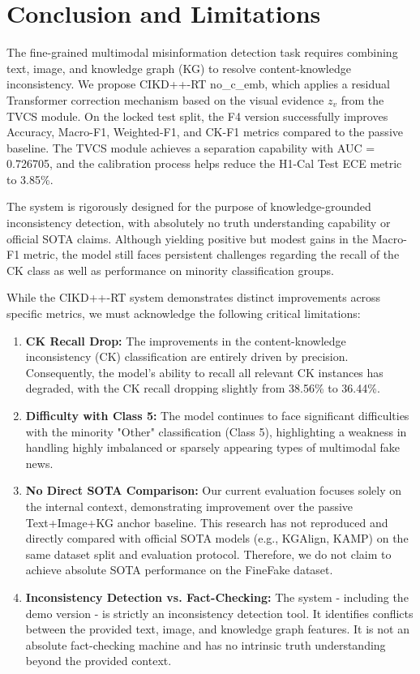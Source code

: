 \section{Conclusion and Limitations}

The fine-grained multimodal misinformation detection task requires combining text, image, and knowledge graph (KG) to resolve content-knowledge inconsistency. We propose CIKD++-RT no\_c\_emb, which applies a residual Transformer correction mechanism based on the visual evidence $z_v$ from the TVCS module. On the locked test split, the F4 version successfully improves Accuracy, Macro-F1, Weighted-F1, and CK-F1 metrics compared to the passive baseline. The TVCS module achieves a separation capability with AUC = 0.726705, and the calibration process helps reduce the H1-Cal Test ECE metric to 3.85\%.

The system is rigorously designed for the purpose of knowledge-grounded inconsistency detection, with absolutely no truth understanding capability or official SOTA claims. Although yielding positive but modest gains in the Macro-F1 metric, the model still faces persistent challenges regarding the recall of the CK class as well as performance on minority classification groups.

While the CIKD++-RT system demonstrates distinct improvements across specific metrics, we must acknowledge the following critical limitations:

\begin{enumerate}
    \item \textbf{CK Recall Drop:} The improvements in the content-knowledge inconsistency (CK) classification are entirely driven by precision. Consequently, the model's ability to recall all relevant CK instances has degraded, with the CK recall dropping slightly from 38.56\% to 36.44\%.
    \item \textbf{Difficulty with Class 5:} The model continues to face significant difficulties with the minority "Other" classification (Class 5), highlighting a weakness in handling highly imbalanced or sparsely appearing types of multimodal fake news.
    \item \textbf{No Direct SOTA Comparison:} Our current evaluation focuses solely on the internal context, demonstrating improvement over the passive Text+Image+KG anchor baseline. This research has not reproduced and directly compared with official SOTA models (e.g., KGAlign, KAMP) on the same dataset split and evaluation protocol. Therefore, we do not claim to achieve absolute SOTA performance on the FineFake dataset.
    \item \textbf{Inconsistency Detection vs. Fact-Checking:} The system - including the demo version - is strictly an inconsistency detection tool. It identifies conflicts between the provided text, image, and knowledge graph features. It is not an absolute fact-checking machine and has no intrinsic truth understanding beyond the provided context.
\end{enumerate}
